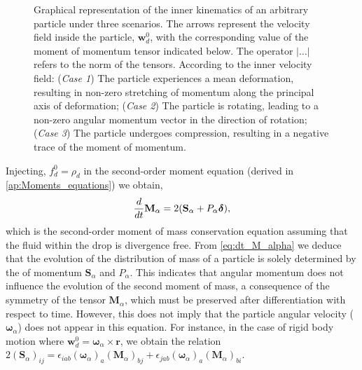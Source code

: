 \begin{figure}[h!]
    \hfill
    \caption{Graphical representation of the inner kinematics   of an arbitrary particle under three scenarios. 
        The arrows represent the velocity field inside the particle, $\textbf{w}_d^0$, with the corresponding value of the moment of momentum tensor indicated below. 
        The operator $|\ldots|$ refers to the norm of the tensors. 
        According to the inner velocity field:
        (\textit{Case 1}) The particle experiences a mean deformation, resulting in non-zero stretching of momentum along the principal axis of deformation;
        (\textit{Case 2}) The particle is rotating, leading to a non-zero angular momentum vector in the direction of rotation;
        (\textit{Case 3}) The particle undergoes compression, resulting in a negative trace of the moment of momentum.
    }
    \label{eq:scheme}
\end{figure}
Injecting, $f_d^0 = \rho_d$ in the second-order moment equation (derived in \ref{ap:Moments_equations}) we obtain,
\begin{equation}
    \ddt {\textbf{M}_\alpha}=2(\textbf{S}_\alpha+P_\alpha\bm\delta),
    \label{eq:dt_M_alpha}
\end{equation}
which is the second-order moment of mass conservation equation assuming that the fluid within the drop is divergence free. 
From \ref{eq:dt_M_alpha} we deduce that the evolution of the distribution of mass of a particle is solely determined by the  of momentum $\textbf{S}_\alpha$ and $P_\alpha$. 
This indicates that angular momentum does not influence the evolution of the second moment of mass, a consequence of the symmetry of the tensor $\textbf{M}_\alpha$, which must be preserved after differentiation with respect to time.
However, this does not imply that the particle angular velocity ($\bm\omega_\alpha$) does not appear in this equation. 
For instance, in the case of rigid body motion where $\textbf{w}_d^0 = \bm\omega_\alpha \times \textbf{r}$, we obtain the relation  $2(\textbf{S}_\alpha)_{ij} = \epsilon_{iab} (\bm\omega_\alpha)_a (\textbf{M}_\alpha)_{bj}+ 
\epsilon_{jab} (\bm\omega_\alpha)_a (\textbf{M}_\alpha)_{bi}  $. 

